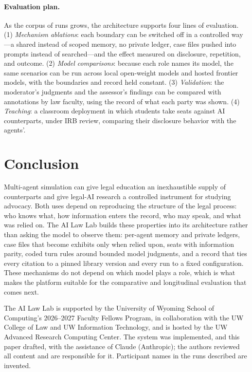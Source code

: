 \documentclass[acmsmall,screen,review]{acmart}
\newcommand{\lab}{AI Law Lab\xspace}
\begin{document}
\paragraph{Evaluation plan.}
As the corpus of runs grows, the architecture supports four lines of evaluation. (1) \emph{Mechanism ablations}: each boundary can be switched off in a controlled way---a shared instead of scoped memory, no private ledger, case files pushed into prompts instead of searched---and the effect measured on disclosure, repetition, and outcome. (2) \emph{Model comparisons}: because each role names its model, the same scenarios can be run across local open-weight models and hosted frontier models, with the boundaries and record held constant. (3) \emph{Validation}: the moderator's judgments and the assessor's findings can be compared with annotations by law faculty, using the record of what each party was shown. (4) \emph{Teaching}: a classroom deployment in which students take seats against AI counterparts, under IRB review, comparing their disclosure behavior with the agents'.

\section{Conclusion}

Multi-agent simulation can give legal education an inexhaustible supply of counterparts and give legal-AI research a controlled instrument for studying advocacy. Both uses depend on reproducing the structure of the legal process: who knows what, how information enters the record, who may speak, and what was relied on. The \lab builds these properties into its architecture rather than asking the model to observe them: per-agent memory and private ledgers, case files that become exhibits only when relied upon, seats with information parity, coded turn rules around bounded model judgments, and a record that ties every citation to a pinned library version and every run to a fixed configuration. These mechanisms do not depend on which model plays a role, which is what makes the platform suitable for the comparative and longitudinal evaluation that comes next.

\begin{acks}
The \lab is supported by the University of Wyoming School of Computing's 2026--2027 Faculty Fellows Program, in collaboration with the UW College of Law and UW Information Technology, and is hosted by the UW Advanced Research Computing Center. The system was implemented, and this paper drafted, with the assistance of Claude (Anthropic); the authors reviewed all content and are responsible for it. Participant names in the runs described are invented.
\end{acks}



\end{document}
